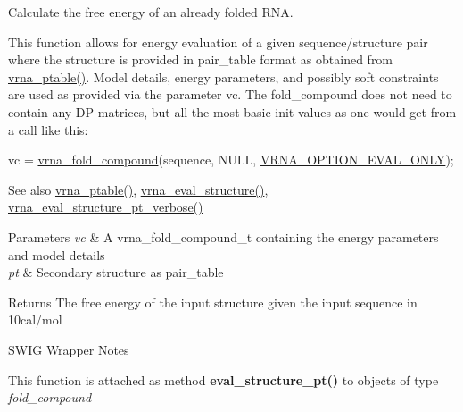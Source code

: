 Calculate the free energy of an already folded R\+NA. 

This function allows for energy evaluation of a given sequence/structure pair where the structure is provided in pair\+\_\+table format as obtained from \mbox{\hyperlink{group__struct__utils_gae829fb8bb7f694c12a9c0bbc34c77c60}{vrna\+\_\+ptable()}}. Model details, energy parameters, and possibly soft constraints are used as provided via the parameter \textquotesingle{}vc\textquotesingle{}. The fold\+\_\+compound does not need to contain any DP matrices, but all the most basic init values as one would get from a call like this\+: 
\begin{DoxyCode}
vc = \mbox{\hyperlink{group__fold__compound_ga6601d994ba32b11511b36f68b08403be}{vrna\_fold\_compound}}(sequence, NULL, \mbox{\hyperlink{group__fold__compound_ga61469c423131552c8483229f8b6c7e0e}{VRNA\_OPTION\_EVAL\_ONLY}});
\end{DoxyCode}


\begin{DoxySeeAlso}{See also}
\mbox{\hyperlink{group__struct__utils_gae829fb8bb7f694c12a9c0bbc34c77c60}{vrna\+\_\+ptable()}}, \mbox{\hyperlink{group__eval_ga58f199f1438d794a265f3b27fc8ea631}{vrna\+\_\+eval\+\_\+structure()}}, \mbox{\hyperlink{group__eval_ga8a517cfeeae8c376ae7b1e0c401d38b4}{vrna\+\_\+eval\+\_\+structure\+\_\+pt\+\_\+verbose()}}
\end{DoxySeeAlso}

\begin{DoxyParams}{Parameters}
{\em vc} & A vrna\+\_\+fold\+\_\+compound\+\_\+t containing the energy parameters and model details \\
\hline
{\em pt} & Secondary structure as pair\+\_\+table \\
\hline
\end{DoxyParams}
\begin{DoxyReturn}{Returns}
The free energy of the input structure given the input sequence in 10cal/mol
\end{DoxyReturn}
\begin{DoxyRefDesc}{S\+W\+I\+G Wrapper Notes}
\item[\mbox{\hyperlink{wrappers__wrappers000026}{S\+W\+I\+G Wrapper Notes}}]This function is attached as method {\bfseries eval\+\_\+structure\+\_\+pt()} to objects of type {\itshape fold\+\_\+compound} \end{DoxyRefDesc}
\mbox{\label{group__eval_ga8a517cfeeae8c376ae7b1e0c401d38b4}} 

